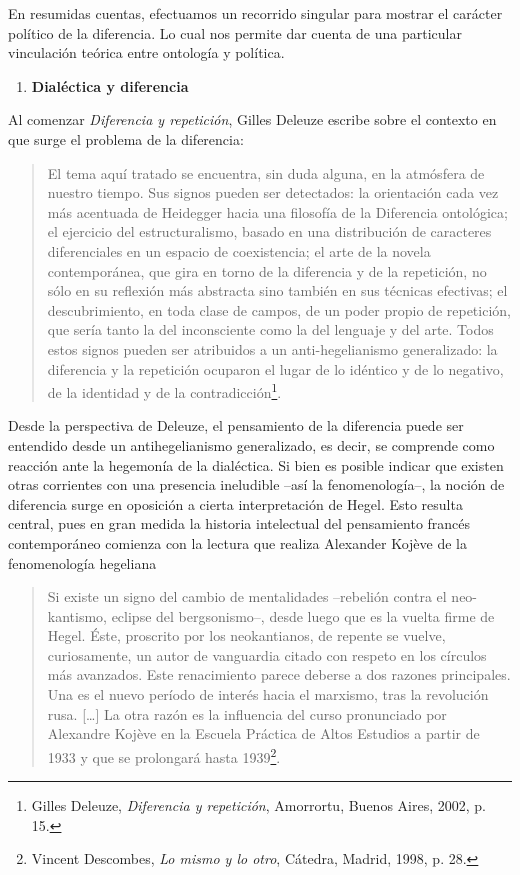 \documentclass{book}
\begin{document}
En resumidas cuentas, efectuamos un recorrido singular para mostrar el
carácter político de la diferencia. Lo cual nos permite dar cuenta de
una particular vinculación teórica entre ontología y política.

\begin{enumerate}
\def\labelenumi{\arabic{enumi}.}
\setcounter{enumi}{1}
\item
  \textbf{Dialéctica y diferencia}
\end{enumerate}

Al comenzar \emph{Diferencia y repetición}, Gilles Deleuze escribe sobre
el contexto en que surge el problema de la diferencia:

\begin{quote}
El tema aquí tratado se encuentra, sin duda alguna, en la atmósfera de
nuestro tiempo. Sus signos pueden ser detectados: la orientación cada
vez más acentuada de Heidegger hacia una filosofía de la Diferencia
ontológica; el ejercicio del estructuralismo, basado en una distribución
de caracteres diferenciales en un espacio de coexistencia; el arte de la
novela contemporánea, que gira en torno de la diferencia y de la
repetición, no sólo en su reflexión más abstracta sino también en sus
técnicas efectivas; el descubrimiento, en toda clase de campos, de un
poder propio de repetición, que sería tanto la del inconsciente como la
del lenguaje y del arte. Todos estos signos pueden ser atribuidos a un
anti-hegelianismo generalizado: la diferencia y la repetición ocuparon
el lugar de lo idéntico y de lo negativo, de la identidad y de la
contradicción\footnote{Gilles Deleuze, \emph{Diferencia y repetición},
  Amorrortu, Buenos Aires, 2002, p. 15.}.
\end{quote}

Desde la perspectiva de Deleuze, el pensamiento de la diferencia puede
ser entendido desde un antihegelianismo generalizado, es decir, se
comprende como reacción ante la hegemonía de la dialéctica. Si bien es
posible indicar que existen otras corrientes con una presencia
ineludible --así la fenomenología--, la noción de diferencia surge en
oposición a cierta interpretación de Hegel. Esto resulta central, pues
en gran medida la historia intelectual del pensamiento francés
contemporáneo comienza con la lectura que realiza Alexander Kojève de la
fenomenología hegeliana

\begin{quote}
Si existe un signo del cambio de mentalidades --rebelión contra el
neo-kantismo, eclipse del bergsonismo--, desde luego que es la vuelta
firme de Hegel. Éste, proscrito por los neokantianos, de repente se
vuelve, curiosamente, un autor de vanguardia citado con respeto en los
círculos más avanzados. Este renacimiento parece deberse a dos razones
principales. Una es el nuevo período de interés hacia el marxismo, tras
la revolución rusa. {[}\ldots{]} La otra razón es la influencia del
curso pronunciado por Alexandre Kojève en la Escuela Práctica de Altos
Estudios a partir de 1933 y que se prolongará hasta 1939\footnote{Vincent
  Descombes, \emph{Lo mismo y lo otro}, Cátedra, Madrid, 1998, p. 28.}.
\end{quote}
\end{document}
